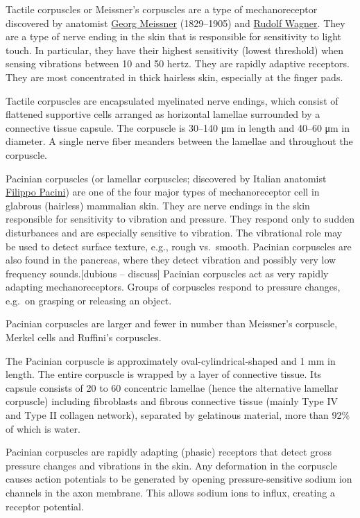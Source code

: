 Tactile corpuscles or Meissner's corpuscles are a type of
mechanoreceptor discovered by anatomist
\href{https://en.wikipedia.org/wiki/Georg_Meissner}{Georg Meissner}
(1829--1905) and
\href{https://en.wikipedia.org/wiki/Rudolf_Wagner}{Rudolf Wagner}. They
are a type of nerve ending in the skin that is responsible for
sensitivity to light touch. In particular, they have their highest
sensitivity (lowest threshold) when sensing vibrations between 10 and 50
hertz. They are rapidly adaptive receptors. They are most concentrated
in thick hairless skin, especially at the finger pads.

Tactile corpuscles are encapsulated myelinated nerve endings, which
consist of flattened supportive cells arranged as horizontal lamellae
surrounded by a connective tissue capsule. The corpuscle is 30--140 μm
in length and 40--60 μm in diameter. A single nerve fiber meanders
between the lamellae and throughout the corpuscle.

Pacinian corpuscles (or lamellar corpuscles; discovered by Italian
anatomist \href{https://en.wikipedia.org/wiki/Filippo_Pacini}{Filippo
Pacini}) are one of the four major types of mechanoreceptor cell in
glabrous (hairless) mammalian skin. They are nerve endings in the skin
responsible for sensitivity to vibration and pressure. They respond only
to sudden disturbances and are especially sensitive to vibration. The
vibrational role may be used to detect surface texture, e.g., rough
vs.~smooth. Pacinian corpuscles are also found in the pancreas, where
they detect vibration and possibly very low frequency sounds.{[}dubious
-- discuss{]} Pacinian corpuscles act as very rapidly adapting
mechanoreceptors. Groups of corpuscles respond to pressure changes,
e.g.~on grasping or releasing an object.

Pacinian corpuscles are larger and fewer in number than Meissner's
corpuscle, Merkel cells and Ruffini's corpuscles.

The Pacinian corpuscle is approximately oval-cylindrical-shaped and 1 mm
in length. The entire corpuscle is wrapped by a layer of connective
tissue. Its capsule consists of 20 to 60 concentric lamellae (hence the
alternative lamellar corpuscle) including fibroblasts and fibrous
connective tissue (mainly Type IV and Type II collagen network),
separated by gelatinous material, more than 92\% of which is water.

Pacinian corpuscles are rapidly adapting (phasic) receptors that detect
gross pressure changes and vibrations in the skin. Any deformation in
the corpuscle causes action potentials to be generated by opening
pressure-sensitive sodium ion channels in the axon membrane. This allows
sodium ions to influx, creating a receptor potential.

